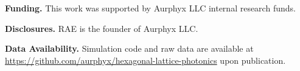 \documentclass[10pt,letterpaper]{article}
\begin{document}
\bigskip

\noindent\textbf{Funding.} This work was supported by Aurphyx LLC internal research funds.

\noindent\textbf{Disclosures.} RAE is the founder of Aurphyx LLC.

\noindent\textbf{Data Availability.} Simulation code and raw data are available at \url{https://github.com/aurphyx/hexagonal-lattice-photonics} upon publication.




\end{document}
